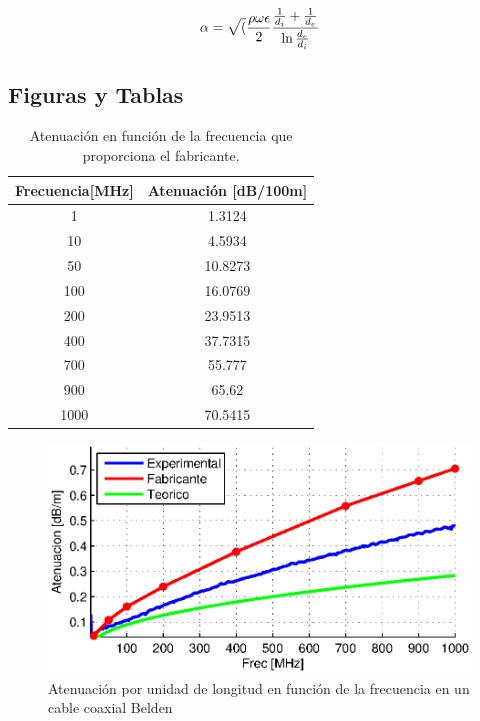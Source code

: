 \documentclass[10pt,conference,a4paper]{IEEEtran}
\begin{document}
\begin{eqnarray}
\label{eq:atenuacion_coaxial}
\alpha = \sqrt(\frac{\rho \omega \epsilon}{2}} \frac{\frac{1}{d_i} + \frac{1}{d_e}}{\ln{\frac{d_e}{d_i}}
\end{eqnarray}

\subsection{Figuras y Tablas}

\begin{table}[htb]
	\renewcommand{\arraystretch}{1.2}
	\centering
	\begin{tabular}{|c|c|}
	\hline
	Frecuencia[MHz] & Atenuación [dB/100m] \\
	\hline
	1 & 1.3124 \\
	10 & 4.5934 \\
	50 & 10.8273 \\	
	100 & 16.0769 \\
	200 & 23.9513 \\
	400 & 37.7315 \\
	700 & 55.777 \\
	900 & 65.62 \\
	1000 & 70.5415 \\
	\hline
	\end{tabular}
\caption{Atenuación en función de la frecuencia que proporciona el fabricante.}
\label{tab:atenuacion_coaxial}
\end{table}

\begin{figure}[htb]
    \centering
    \includegraphics[width=\columnwidth]{figuras/atenuacion_comparada.eps}
    \caption{Atenuación por unidad de longitud en función de la frecuencia en un cable coaxial Belden}
    \label{fig:atenuacion_comparada}
\end{figure}
\end{document}
